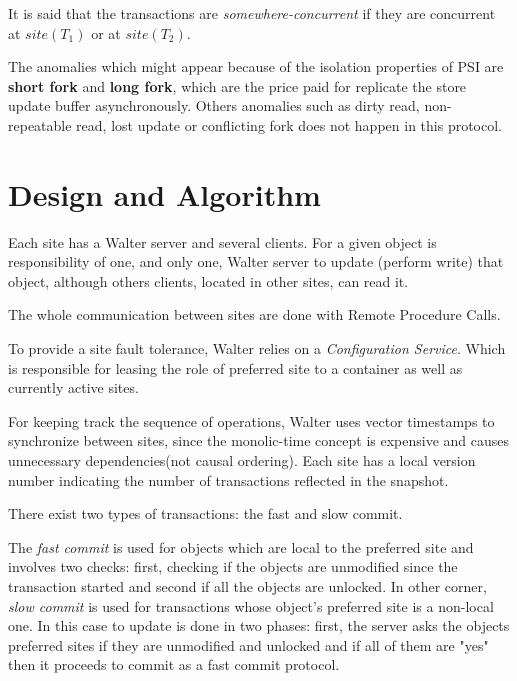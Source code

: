 \documentclass[a4paper]{article}
\begin{document}
It is said that the transactions are \textit{somewhere-concurrent} if they are concurrent at $site(T_{1})$ or at $site(T_{2})$.

The anomalies which might appear because of the isolation properties of PSI are \textbf{short fork} and \textbf{long fork}, which are the price paid for replicate the store update buffer asynchronously. Others anomalies such as dirty read, non-repeatable read, lost update or conflicting fork does not happen in this protocol. 


\section{Design and Algorithm}

Each site has a Walter server and several clients. For a given object is responsibility of one, and only one, Walter server to update (perform write) that object, although others clients, located in other sites, can read it.

The whole communication between sites are done with Remote Procedure Calls. %

To provide a site fault tolerance, Walter relies on a \textit{Configuration Service}. Which is responsible for leasing the role of preferred site to a container as well as currently active sites. 

For keeping track the sequence of operations, Walter uses vector timestamps to synchronize between sites, since the monolic-time concept is expensive and causes unnecessary dependencies(not causal ordering). Each site has a local version number indicating the number of transactions reflected in the snapshot.

There exist two types of transactions: the fast and slow commit. 

The \textit{fast commit} is used for objects which are local to the preferred site and involves two checks: first, checking if the objects are unmodified since the transaction started and second if all the objects are unlocked. 
In other corner, \textit{slow commit} is used for transactions whose object's preferred site is a non-local one. In this case to update is done in two phases: first, the server asks the objects preferred sites if they are unmodified and unlocked and if all of them are "yes" then it proceeds to commit as a fast commit protocol. %
\end{document}
